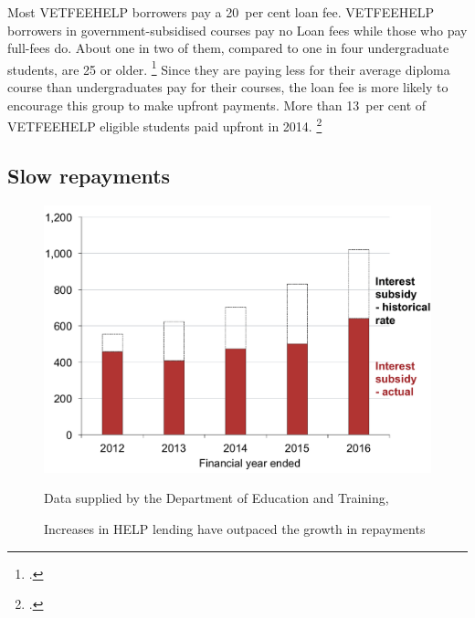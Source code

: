 \documentclass{grattan}
\begin{document}
Most \gls{VETFEEHELP} borrowers pay a 20~per cent loan fee.
\gls{VETFEEHELP} borrowers in government-subsidised courses pay no \gls{Loan fees} while those who pay full-fees do.
About one in two of them, compared to one in four undergraduate students, are 25 or older.%
\footcites[][Table~1]{Education20152014VETFEEa}[][Table~2.1]{Education2015StudentsSelectedhigher} %
Since they are paying less for their average diploma course than undergraduates pay for their courses, the loan fee is more likely to encourage this group to make upfront payments.
More than 13~per cent of \gls{VETFEEHELP} eligible students paid upfront in 2014.%
\footcite{Education2014VETFEEHELP}

\subsection{Slow repayments }\label{slow-repayments}

\begin{figure}
\caption{Increases in \gls{HELP} lending have outpaced the growth in repayments}\label{fig:fig7-increases-help-lending-outpaced-growth-repayments}


\includegraphics[page=7]{atlas/Chartpack.pdf}

%
{Data supplied by the Department of Education and Training, \textcites{Education2015Highereducationreport}{Education20152014VETFEEa}}
\end{figure}
\end{document}
